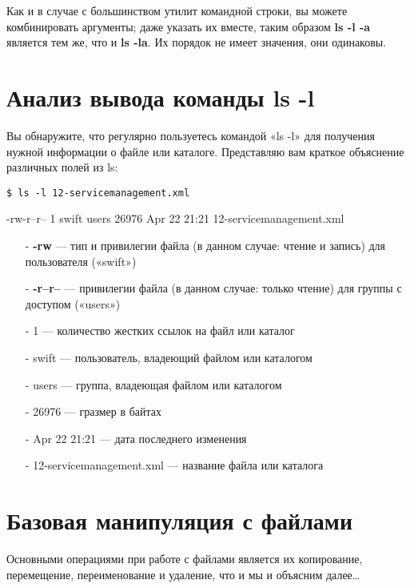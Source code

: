 \documentclass[12pt]{book}
\begin{document}
Как и в случае с большинством утилит командной строки, вы можете комбинировать аргументы; даже указать их вместе, таким образом \textbf{ls -l -a} является тем же, что и \textbf{ls -la}. Их порядок не имеет значения, они одинаковы.

\section{Анализ вывода команды ls -l}

Вы обнаружите, что регулярно пользуетесь командой «ls -l» для получения нужной информации о файле или каталоге. Представляю вам краткое объяснение  различных полей из ls:

\vspace{3mm}
\begin{tcolorbox}
\begin{lstlisting}
$ ls -l 12-servicemanagement.xml
\end{lstlisting}
-rw-r--r-- 1 swift users 26976 Apr 22 21:21 12-servicemanagement.xml

\end{tcolorbox}

\begin{itemize}
	\item[-] \textbf{-rw} — тип и привилегии файла (в данном случае: чтение и запись) для пользователя («swift»)
	\item[-] \textbf{-r--r--} — привилегии файла (в данном случае: только чтение) для группы с доступом («users»)
	\item[-] 1 — количество жестких ссылок на файл или каталог
	\item[-] swift — пользователь, владеющий файлом или каталогом
	\item[-] users — группа, владеющая файлом или каталогом
	\item[-] 26976 — гразмер в байтах
	\item[-] Apr 22 21:21 — дата последнего изменения
	\item[-] 12-servicemanagement.xml — название файла или каталога
\end{itemize}

\section{Базовая манипуляция с файлами}

Основными операциями при работе с файлами является их копирование, перемещение, переименование и удаление, что и мы и объясним далее\ldots
\end{document}
